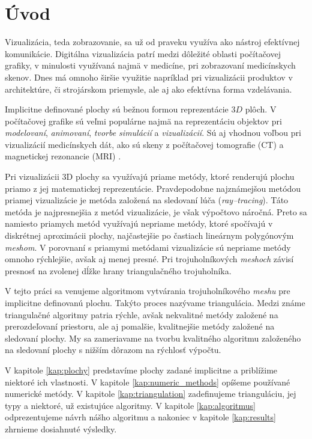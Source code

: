 \chapter*{Úvod} %

Vizualizácia, teda zobrazovanie, sa už od praveku využíva ako nástroj efektívnej komunikácie.
Digitálna vizualizácia patrí medzi dôležité oblasti počítačovej grafiky, 
v minulosti využívaná najmä v medicíne, pri zobrazovaní medicínskych skenov.
Dnes má omnoho širšie využitie napríklad pri vizualizácii produktov v architektúre, 
či strojárskom priemysle, ale aj ako efektívna forma vzdelávania. 

Implicitne definované plochy sú bežnou formou reprezentácie $3D$ plôch. V počítačovej grafike 
sú veľmi populárne najmä na reprezentáciu objektov pri \textit{modelovaní}, \textit{animovaní}, 
\textit{tvorbe simulácií} a \textit{vizualizácií}. Sú aj vhodnou
voľbou pri vizualizácií medicínskych dát, ako sú skeny z počítačovej tomografie (CT) a magnetickej
rezonancie (MRI) \cite{de2015survey}.

Pri vizualizácii 3D plochy sa využívajú priame metódy, ktoré renderujú plochu 
priamo z jej matematickej reprezentácie. Pravdepodobne najznámejšou metódou priamej vizualizácie je 
metóda založená na sledovaní lúča (\textit{ray--tracing}). Táto metóda je najpresnejšia z metód vizualizácie,
je však výpočtovo náročná. Preto sa namiesto priamych metód využívajú nepriame metódy, 
ktoré spočívajú v diskrétnej aproximácii plochy, najčastejšie po častiach lineárnym 
polygónovým \textit{meshom}. V porovnaní s priamymi metódami 
vizualizácie sú nepriame metódy omnoho rýchlejšie, avšak aj menej presné. Pri trojuholníkových 
\textit{meshoch} závisí presnosť na zvolenej dĺžke hrany triangulačného trojuholníka. 

V tejto práci sa venujeme algoritmom vytvárania trojuholníkového \textit{meshu} pre 
implicitne definovanú plochu. Takýto proces nazývame triangulácia. Medzi známe triangulačné 
algoritmy patria rýchle, avšak nekvalitné metódy založené na prerozdeľovaní priestoru, 
ale aj pomalšie, kvalitnejšie metódy založené na sledovaní plochy.
My sa zameriavame na tvorbu kvalitného algoritmu založeného na sledovaní plochy
s nižším dôrazom na rýchlosť výpočtu.

V kapitole \ref{kap:plochy} predstavíme plochy zadané implicitne a priblížime niektoré ich vlastnosti.
V kapitole \ref{kap:numeric_methods} opíšeme používané numerické metódy.
V kapitole \ref{kap:triangulation} zadefinujeme trianguláciu, jej typy a niektoré, už existujúce algoritmy.
V kapitole \ref{kap:algoritmus} odprezentujeme návrh nášho algoritmu a nakoniec v 
kapitole \ref{kap:results} zhrnieme dosiahnuté výsledky. 


